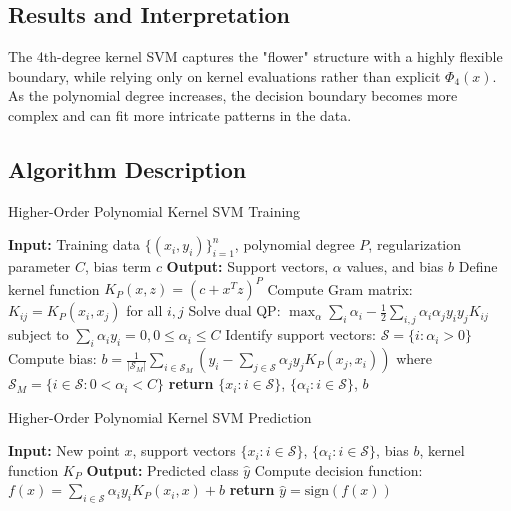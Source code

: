 \documentclass[11pt]{article}
\begin{document}
\subsection{Results and Interpretation}
The 4th-degree kernel SVM captures the "flower" structure with a highly flexible boundary, while relying only on kernel evaluations rather than explicit $\Phi_4(x)$. As the polynomial degree increases, the decision boundary becomes more complex and can fit more intricate patterns in the data.

\subsection{Algorithm Description}
\begin{algorithm}
\caption{Higher-Order Polynomial Kernel SVM Training}
\begin{algorithmic}[1]
\State \textbf{Input:} Training data $\{(x_i, y_i)\}_{i=1}^n$, polynomial degree $P$, regularization parameter $C$, bias term $c$
\State \textbf{Output:} Support vectors, $\alpha$ values, and bias $b$
\State Define kernel function $K_P(x,z) = (c + x^Tz)^P$
\State Compute Gram matrix: $K_{ij} = K_P(x_i, x_j)$ for all $i,j$
\State Solve dual QP: $\max_{\alpha} \sum_i \alpha_i - \frac{1}{2}\sum_{i,j}\alpha_i\alpha_j y_i y_j K_{ij}$ subject to $\sum_i \alpha_i y_i=0, 0 \leq \alpha_i \leq C$
\State Identify support vectors: $\mathcal{S} = \{i : \alpha_i > 0\}$
\State Compute bias: $b = \frac{1}{|\mathcal{S}_M|}\sum_{i \in \mathcal{S}_M} \left(y_i - \sum_{j \in \mathcal{S}} \alpha_j y_j K_P(x_j, x_i)\right)$ where $\mathcal{S}_M = \{i \in \mathcal{S} : 0 < \alpha_i < C\}$
\State \textbf{return} $\{x_i : i \in \mathcal{S}\}$, $\{\alpha_i : i \in \mathcal{S}\}$, $b$
\end{algorithmic}
\end{algorithm}

\begin{algorithm}
\caption{Higher-Order Polynomial Kernel SVM Prediction}
\begin{algorithmic}[1]
\State \textbf{Input:} New point $x$, support vectors $\{x_i : i \in \mathcal{S}\}$, $\{\alpha_i : i \in \mathcal{S}\}$, bias $b$, kernel function $K_P$
\State \textbf{Output:} Predicted class $\hat{y}$
\State Compute decision function: $f(x) = \sum_{i \in \mathcal{S}} \alpha_i y_i K_P(x_i, x) + b$
\State \textbf{return} $\hat{y} = \text{sign}(f(x))$
\end{algorithmic}
\end{algorithm}
\end{document}

